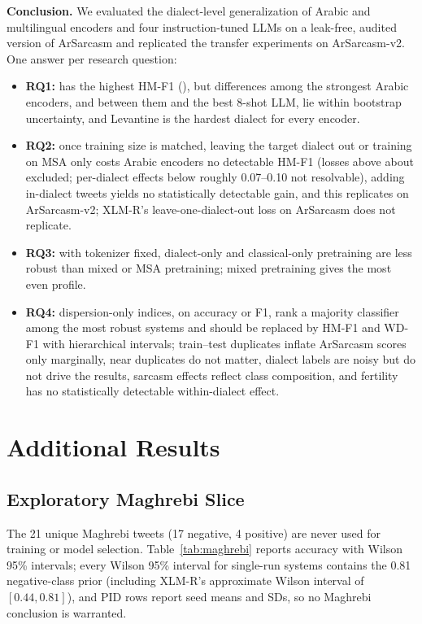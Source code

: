\documentclass[11pt]{article}
\begin{document}
\textbf{Conclusion.} We evaluated the dialect-level generalization of \nEnc{} Arabic and multilingual encoders and four instruction-tuned LLMs on a leak-free, audited version of ArSarcasm and replicated the transfer experiments on ArSarcasm-v2. One answer per research question:
\begin{itemize}
\item \textbf{RQ1:} \bestEnc{} has the highest HM-F1 (\bestEncHM), but differences among the \topGroupN{} strongest Arabic encoders, and between them and the best 8-shot LLM, lie within bootstrap uncertainty, and Levantine is the hardest dialect for every encoder.
\item \textbf{RQ2:} once training size is matched, leaving the target dialect out or training on MSA only costs Arabic encoders no detectable HM-F1 (losses above about \lodoArLossBound{} excluded; per-dialect effects below roughly 0.07--0.10 not resolvable), adding in-dialect tweets yields no statistically detectable gain, and this replicates on ArSarcasm-v2; XLM-R's leave-one-dialect-out loss on ArSarcasm does not replicate.
\item \textbf{RQ3:} with tokenizer fixed, dialect-only and classical-only pretraining are less robust than mixed or MSA pretraining; mixed pretraining gives the most even profile.
\item \textbf{RQ4:} dispersion-only indices, on accuracy or F1, rank a majority classifier among the most robust systems and should be replaced by HM-F1 and WD-F1 with hierarchical intervals; train--test duplicates inflate ArSarcasm scores only marginally, near duplicates do not matter, dialect labels are noisy but do not drive the results, sarcasm effects reflect class composition, and fertility has no statistically detectable within-dialect effect.
\end{itemize}

\appendix
\section{Additional Results}
\label{app:extra}

\subsection{Exploratory Maghrebi Slice}
\label{app:maghrebi}
The 21 unique Maghrebi tweets (17 negative, 4 positive) are never used for training or model selection. Table~\ref{tab:maghrebi} reports accuracy with Wilson 95\% intervals; every Wilson 95\% interval for single-run systems contains the 0.81 negative-class prior (including XLM-R's approximate Wilson interval of $[0.44, 0.81]$), and PID rows report seed means and SDs, so no Maghrebi conclusion is warranted.
\end{document}
